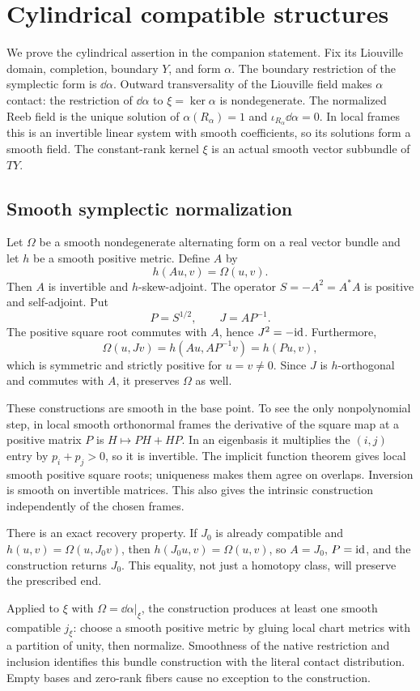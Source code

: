 \section{Cylindrical compatible structures}
We prove the cylindrical assertion in the companion statement. Fix its
Liouville domain, completion, boundary $Y$, and form $\alpha$.
The boundary restriction of the symplectic form is $\dd\alpha$.
Outward transversality of the Liouville field makes $\alpha$ contact:
the restriction of $\dd\alpha$ to $\xi=\ker\alpha$ is nondegenerate.
The normalized Reeb field is the unique solution of
$\alpha(R_\alpha)=1$ and $\iota_{R_\alpha}\dd\alpha=0$.
In local frames this is an invertible linear system with smooth
coefficients, so its solutions form a smooth field. The constant-rank
kernel $\xi$ is an actual smooth vector subbundle of $TY$.

\subsection{Smooth symplectic normalization}
Let $\Omega$ be a smooth nondegenerate alternating form on a real
vector bundle and let $h$ be a smooth positive metric. Define $A$ by
\[
 h(Au,v)=\Omega(u,v).
\]
Then $A$ is invertible and $h$-skew-adjoint. The operator
$S=-A^2=A^*A$ is positive and self-adjoint. Put
\[
 P=S^{1/2},\qquad J=AP^{-1}.
\]
The positive square root commutes with $A$, hence $J^2=-\mathrm{id}$.
Furthermore,
\[
 \Omega(u,Jv)=h(Au,AP^{-1}v)=h(Pu,v),
\]
which is symmetric and strictly positive for $u=v\ne0$.
Since $J$ is $h$-orthogonal and commutes with $A$, it preserves
$\Omega$ as well.

These constructions are smooth in the base point. To see the only
nonpolynomial step, in local smooth orthonormal frames the derivative
of the square map at a positive matrix $P$ is
$H\mapsto PH+HP$. In an eigenbasis it multiplies the $(i,j)$ entry
by $p_i+p_j>0$, so it is invertible. The implicit function theorem
gives local smooth positive square roots; uniqueness makes them agree
on overlaps. Inversion is smooth on invertible matrices. This also
gives the intrinsic construction independently of the chosen frames.

There is an exact recovery property. If $J_0$ is already compatible
and $h(u,v)=\Omega(u,J_0v)$, then
$h(J_0u,v)=\Omega(u,v)$, so $A=J_0$, $P=\mathrm{id}$, and the construction
returns $J_0$. This equality, not just a homotopy class, will preserve
the prescribed end.

Applied to $\xi$ with $\Omega=\dd\alpha|_\xi$, the construction
produces at least one smooth compatible $j_\xi$: choose a smooth
positive metric by gluing local chart metrics with a partition of
unity, then normalize. Smoothness of the native restriction and
inclusion identifies this bundle construction with the literal
contact distribution. Empty bases and zero-rank fibers cause no
exception to the construction.

